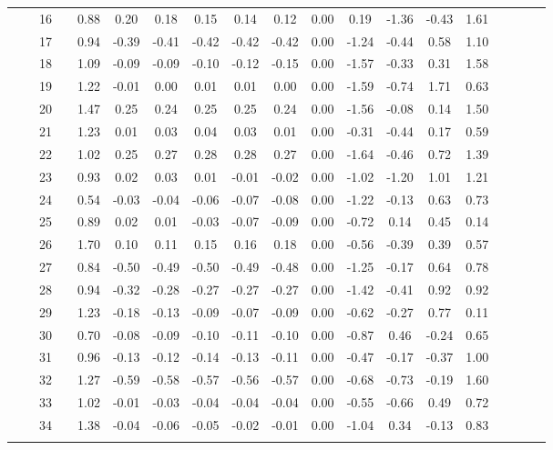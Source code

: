 \documentclass[a4paper,11pt,oneside,openany]{jsbook}
\newcommand{\bhline}[1]{\noalign{\hrule height #1}}
\begin{document}
\begin{table}[h!]
\begin{center}
\begin{tabular}{ccccccccccccccccccc}
 &  & 16 &  & 0.88 & 0.20  & 0.18  & 0.15  & 0.14  & 0.12  & 0.00 & 0.19  & -1.36 & -0.43 & 1.61 \\
 &  & 17 &  & 0.94 & -0.39 & -0.41 & -0.42 & -0.42 & -0.42 & 0.00 & -1.24 & -0.44 & 0.58  & 1.10 \\
 &  & 18 &  & 1.09 & -0.09 & -0.09 & -0.10 & -0.12 & -0.15 & 0.00 & -1.57 & -0.33 & 0.31  & 1.58 \\
 &  & 19 &  & 1.22 & -0.01 & 0.00  & 0.01  & 0.01  & 0.00  & 0.00 & -1.59 & -0.74 & 1.71  & 0.63 \\
 &  & 20 &  & 1.47 & 0.25  & 0.24  & 0.25  & 0.25  & 0.24  & 0.00 & -1.56 & -0.08 & 0.14  & 1.50 \\
 &  & 21 &  & 1.23 & 0.01  & 0.03  & 0.04  & 0.03  & 0.01  & 0.00 & -0.31 & -0.44 & 0.17  & 0.59 \\
 &  & 22 &  & 1.02 & 0.25  & 0.27  & 0.28  & 0.28  & 0.27  & 0.00 & -1.64 & -0.46 & 0.72  & 1.39 \\
 &  & 23 &  & 0.93 & 0.02  & 0.03  & 0.01  & -0.01 & -0.02 & 0.00 & -1.02 & -1.20 & 1.01  & 1.21 \\
 &  & 24 &  & 0.54 & -0.03 & -0.04 & -0.06 & -0.07 & -0.08 & 0.00 & -1.22 & -0.13 & 0.63  & 0.73 \\
 &  & 25 &  & 0.89 & 0.02  & 0.01  & -0.03 & -0.07 & -0.09 & 0.00 & -0.72 & 0.14  & 0.45  & 0.14 \\
 &  & 26 &  & 1.70 & 0.10  & 0.11  & 0.15  & 0.16  & 0.18  & 0.00 & -0.56 & -0.39 & 0.39  & 0.57 \\
 &  & 27 &  & 0.84 & -0.50 & -0.49 & -0.50 & -0.49 & -0.48 & 0.00 & -1.25 & -0.17 & 0.64  & 0.78 \\
 &  & 28 &  & 0.94 & -0.32 & -0.28 & -0.27 & -0.27 & -0.27 & 0.00 & -1.42 & -0.41 & 0.92  & 0.92 \\
 &  & 29 &  & 1.23 & -0.18 & -0.13 & -0.09 & -0.07 & -0.09 & 0.00 & -0.62 & -0.27 & 0.77  & 0.11 \\
 &  & 30 &  & 0.70 & -0.08 & -0.09 & -0.10 & -0.11 & -0.10 & 0.00 & -0.87 & 0.46  & -0.24 & 0.65 \\
 &  & 31 &  & 0.96 & -0.13 & -0.12 & -0.14 & -0.13 & -0.11 & 0.00 & -0.47 & -0.17 & -0.37 & 1.00 \\
 &  & 32 &  & 1.27 & -0.59 & -0.58 & -0.57 & -0.56 & -0.57 & 0.00 & -0.68 & -0.73 & -0.19 & 1.60 \\
 &  & 33 &  & 1.02 & -0.01 & -0.03 & -0.04 & -0.04 & -0.04 & 0.00 & -0.55 & -0.66 & 0.49  & 0.72 \\
 &  & 34 &  & 1.38 & -0.04 & -0.06 & -0.05 & -0.02 & -0.01 & 0.00 & -1.04 & 0.34  & -0.13 & 0.83 \\
\bhline{1pt}
\end{tabular}
\label{t5param}
\end{center}
\end{table}
\end{document}
